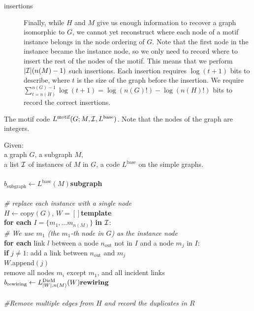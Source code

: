 \documentclass[twoside,11pt]{article}
\newcommand{\tab}{\hspace*{5mm}}
\begin{document}
\begin{description}
\item[insertions] Finally, while $H$ and $M$ give us enough information to recover a graph isomorphic to $G$, we cannot yet reconstruct where each node of a motif instance belongs in the node ordering of $G$. Note that the first node in the instance became the instance node, so we only need to record where to insert the rest of the nodes of the motif. This means that we perform $|{\cal I}| (n(M)-1)$ such insertions. Each insertion requires $\log (t+1)$ bits to describe, where $t$ is the size of the graph before the insertion. We require $\sum_{t=n(H)}^{n(G)-1} \log (t+1) = \log (n(G)!) - \log (n(H)!)$ bits to record the correct insertions.
\end{description} 

\begin{pseudo}[th]
\caption{The motif code $L^\text{motif}(G ; M, {\cal I}, L^\text{base})$. Note that the nodes of the graph are integers.}
\label{algorithm:motif-code}
{ 
Given:\\ 
\tab a graph $G$, a subgraph $M$,\\ 
\tab a list $\cal I$ of instances of $M$ in $G$, a code $L^\text{base}$ on the simple graphs.\\
\\
$b_\text{subgraph} \leftarrow L^\text{base}(M)$\hfill \textbf{subgraph} \\
\\
\emph{\# replace each instance with a single node} \\
$H \leftarrow \text{copy}(G)$, $W = [] $\hfill \textbf{template} \\
\textbf{for each } $I = \{ m_1, \ldots m_{n(M)}\}$ \textbf{in} $\cal I$:\\
\tab \emph{\# We use $m_1$ (the $m_1$-th node in $G$) as the instance node}\\
\tab \textbf{for each} link $l$ between a node $n_\text{out}$ not in $I$ and a node $m_j$ in $I$:\\
\tab \tab \textbf{if} $j \neq 1$: add a link between $n_\text{out}$ and $m_j$\\
\tab \tab $W$.append$(j)$\\
\tab remove all nodes $m_i$ except $m_1$, and all incident links\\
$b_\text{rewiring} \leftarrow  L^\text{DirM}_{|W|, n(M)}(W)\hfill\textbf{rewiring}$\\
\\
\emph{\#Remove multiple edges from $H$  and record the duplicates in $R$}\\
}
\end{pseudo}
\end{document}
